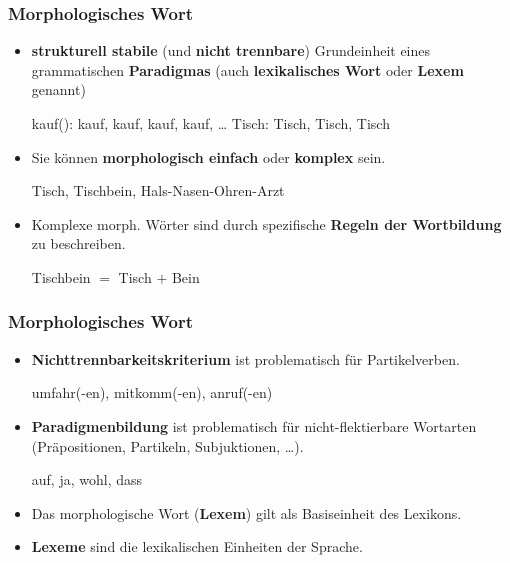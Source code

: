 \begin{frame}
\frametitle{Morphologisches Wort}

\begin{itemize}
	\item \textbf{strukturell stabile} (und \textbf{nicht trennbare}) Grundeinheit eines grammatischen \textbf{Paradigmas} (auch \textbf{lexikalisches Wort} oder \textbf{Lexem} genannt)

	\ea 
		\ea kauf(): kauf, kauf, kauf, kauf, \ldots
		\ex Tisch: Tisch, Tisch, Tisch
		\z 
	\z 

\pause 
	
	\item Sie können \textbf{morphologisch einfach} oder \textbf{komplex} sein.
	
	\ea Tisch, Tischbein, Hals-Nasen-Ohren-Arzt
	\z 

\pause 
	
	\item Komplexe morph. Wörter sind durch spezifische \textbf{Regeln der Wortbildung} zu beschreiben.
	
	\settowidth{}
	\ea Tischbein $=$ Tisch $+$ Bein \jambox{[Komposition]}
	\z 
\end{itemize}

\end{frame}


\begin{frame}
\frametitle{Morphologisches Wort}

\begin{itemize}
	\item \textbf{Nichttrennbarkeitskriterium} ist problematisch für Partikelverben.
	
	\ea umfahr(-en), mitkomm(-en), anruf(-en)
	\z 
	
	\item \textbf{Paradigmenbildung} ist problematisch für nicht-flektierbare Wortarten (Präpositionen, Partikeln, Subjuktionen, \ldots).
	
	\ea auf, ja, wohl, dass
	\z 
	
	\item Das morphologische Wort (\textbf{Lexem}) gilt als Basiseinheit des Lexikons.
	
	\item \textbf{Lexeme} sind die lexikalischen Einheiten der Sprache.
\end{itemize}

\end{frame}


